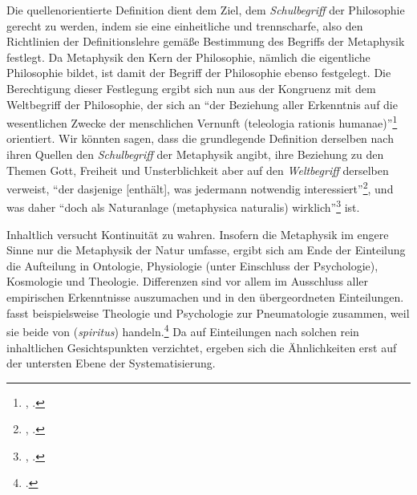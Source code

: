 Die quellenorientierte Definition dient dem Ziel, dem \emph{Schulbegriff} der
Philosophie gerecht zu werden, indem sie eine einheitliche und trennscharfe,
also den Richtlinien der Definitionslehre gemäße Bestimmung des Begriffs der
Metaphysik festlegt. Da Metaphysik den Kern der Philosophie, nämlich die
eigentliche Philosophie bildet, ist damit der Begriff der Philosophie ebenso
festgelegt. Die Berechtigung dieser Festlegung ergibt sich nun aus der Kongruenz
mit dem Weltbegriff der Philosophie, der sich an \enquote{der Beziehung aller
Erkenntnis auf die wesentlichen Zwecke der menschlichen
Vernunft ({teleologia rationis humanae})}\footnote{\cite[][B
867]{Kant:KritikderreinenVernunft2003}, \cite[][III: 542.27--28]{Kant:GesammelteWerke1900ff.}.} orientiert.
Wir könnten sagen, dass die grundlegende Definition derselben nach
ihren Quellen den \emph{Schulbegriff} der Metaphysik angibt, ihre Beziehung zu den
Themen Gott, Freiheit und Unsterblichkeit aber auf den \emph{Weltbegriff} derselben
verweist, \enquote{der dasjenige [enthält], was jedermann notwendig
interessiert}\footnote{\cite[][B~867]{Kant:KritikderreinenVernunft2003}, \cite[][III:
543.31--32]{Kant:GesammelteWerke1900ff.}.}, und was daher \enquote{doch als
Naturanlage (metaphysica naturalis)
wirklich}\footnote{\cite[][B~21]{Kant:KritikderreinenVernunft2003}, \cite[][III:
41.3]{Kant:GesammelteWerke1900ff.}.} ist.

Inhaltlich versucht  Kontinuität zu wahren. Insofern die
Metaphysik im engere Sinne nur die Metaphysik der Natur umfasse, ergibt sich am
Ende der Einteilung die  Aufteilung in Ontologie,
Physiologie (unter Einschluss der Psychologie), Kosmologie und Theologie.
Differenzen sind vor allem im Ausschluss aller empirischen Erkenntnisse
auszumachen und in den übergeordneten Einteilungen.
 fasst
beispielsweise Theologie und Psychologie zur Pneumatologie zusammen, weil sie
beide von  (\emph{spiritus})
handeln.\footcite[Vgl.][\S~79]{Wolff:Discursuspraeliminarisdephilosophiaingenere1996}
Da  auf Einteilungen nach solchen rein inhaltlichen
Gesichtspunkten verzichtet, ergeben sich die Ähnlichkeiten erst auf der
untersten Ebene der Systematisierung.


